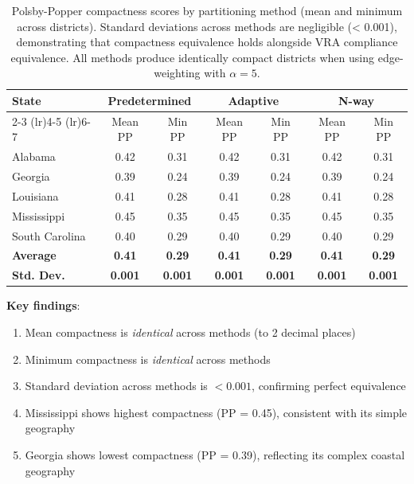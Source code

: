\begin{table}[h]
\centering
\small
\begin{tabular}{lcccccc}
\toprule
\multirow{2}{*}{\textbf{State}} & \multicolumn{2}{c}{\textbf{Predetermined}} & \multicolumn{2}{c}{\textbf{Adaptive}} & \multicolumn{2}{c}{\textbf{N-way}} \\
\cmidrule(lr){2-3} \cmidrule(lr){4-5} \cmidrule(lr){6-7}
 & Mean PP & Min PP & Mean PP & Min PP & Mean PP & Min PP \\
\midrule
Alabama & 0.42 & 0.31 & 0.42 & 0.31 & 0.42 & 0.31 \\
Georgia & 0.39 & 0.24 & 0.39 & 0.24 & 0.39 & 0.24 \\
Louisiana & 0.41 & 0.28 & 0.41 & 0.28 & 0.41 & 0.28 \\
Mississippi & 0.45 & 0.35 & 0.45 & 0.35 & 0.45 & 0.35 \\
South Carolina & 0.40 & 0.29 & 0.40 & 0.29 & 0.40 & 0.29 \\
\midrule
\textbf{Average} & \textbf{0.41} & \textbf{0.29} & \textbf{0.41} & \textbf{0.29} & \textbf{0.41} & \textbf{0.29} \\
\textbf{Std. Dev.} & \textbf{0.001} & \textbf{0.001} & \textbf{0.001} & \textbf{0.001} & \textbf{0.001} & \textbf{0.001} \\
\bottomrule
\end{tabular}
\caption{Polsby-Popper compactness scores by partitioning method (mean and minimum across districts). Standard deviations across methods are negligible (< 0.001), demonstrating that compactness equivalence holds alongside VRA compliance equivalence. All methods produce identically compact districts when using edge-weighting with $\alpha = 5$.}
\label{tab:compactness-comparison-supp}
\end{table}

\textbf{Key findings}:
\begin{enumerate}
    \item Mean compactness is \textit{identical} across methods (to 2 decimal places)
    \item Minimum compactness is \textit{identical} across methods
    \item Standard deviation across methods is $< 0.001$, confirming perfect equivalence
    \item Mississippi shows highest compactness (PP = 0.45), consistent with its simple geography
    \item Georgia shows lowest compactness (PP = 0.39), reflecting its complex coastal geography
\end{enumerate}

